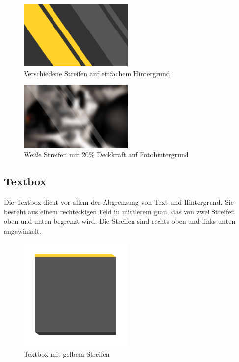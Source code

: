 \documentclass{article}
\begin{document}
\begin{figure}[H]
\begin{center}
\includegraphics[width=0.5\textwidth]{Docs/streifen_beispiel.png}
\end{center}
\caption{Verschiedene Streifen auf einfachem Hintergrund}
\end{figure}

\begin{figure}[H]
\begin{center}
\includegraphics[width=0.5\textwidth]{Docs/streifen_foto.png}
\end{center}
\caption{Weiße Streifen mit 20\% Deckkraft auf Fotohintergrund}
\end{figure}

\subsection{Textbox}
Die Textbox dient vor allem der Abgrenzung von Text und Hintergrund.
Sie besteht aus einem rechteckigen Feld in mittlerem grau, das von zwei Streifen oben und unten begrenzt wird.
Die Streifen sind rechts oben und links unten angewinkelt.

\begin{figure}[H]
\begin{center}
\includegraphics[width=0.5\textwidth]{Docs/textbox.png}
\end{center}
\caption{Textbox mit gelbem Streifen}
\end{figure}
\end{document}
